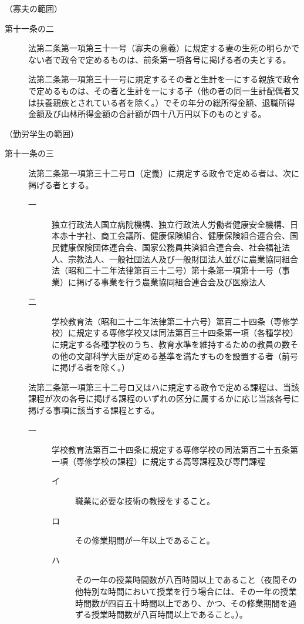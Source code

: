 \documentclass[twocolumn,a4j,10pt]{ltjtarticle}
\begin{document}
\noindent\hspace{10pt}（寡夫の範囲）
\begin{description}
\item[第十一条の二]法第二条第一項第三十一号（寡夫の意義）に規定する妻の生死の明らかでない者で政令で定めるものは、前条第一項各号に掲げる者の夫とする。
\item[]法第二条第一項第三十一号に規定するその者と生計を一にする親族で政令で定めるものは、その者と生計を一にする子（他の者の同一生計配偶者又は扶養親族とされている者を除く。）でその年分の総所得金額、退職所得金額及び山林所得金額の合計額が四十八万円以下のものとする。
\end{description}
\noindent\hspace{10pt}（勤労学生の範囲）
\begin{description}
\item[第十一条の三]法第二条第一項第三十二号ロ（定義）に規定する政令で定める者は、次に掲げる者とする。
\begin{description}
\item[一]独立行政法人国立病院機構、独立行政法人労働者健康安全機構、日本赤十字社、商工会議所、健康保険組合、健康保険組合連合会、国民健康保険団体連合会、国家公務員共済組合連合会、社会福祉法人、宗教法人、一般社団法人及び一般財団法人並びに農業協同組合法（昭和二十二年法律第百三十二号）第十条第一項第十一号（事業）に掲げる事業を行う農業協同組合連合会及び医療法人
\item[二]学校教育法（昭和二十二年法律第二十六号）第百二十四条（専修学校）に規定する専修学校又は同法第百三十四条第一項（各種学校）に規定する各種学校のうち、教育水準を維持するための教員の数その他の文部科学大臣が定める基準を満たすものを設置する者（前号に掲げる者を除く。）
\end{description}
\item[]法第二条第一項第三十二号ロ又はハに規定する政令で定める課程は、当該課程が次の各号に掲げる課程のいずれの区分に属するかに応じ当該各号に掲げる事項に該当する課程とする。
\begin{description}
\item[一]学校教育法第百二十四条に規定する専修学校の同法第百二十五条第一項（専修学校の課程）に規定する高等課程及び専門課程
\begin{description}
\item[イ]職業に必要な技術の教授をすること。
\item[ロ]その修業期間が一年以上であること。
\item[ハ]その一年の授業時間数が八百時間以上であること（夜間その他特別な時間において授業を行う場合には、その一年の授業時間数が四百五十時間以上であり、かつ、その修業期間を通ずる授業時間数が八百時間以上であること。）。

\end{description}
\end{description}
\end{description}
\end{document}

